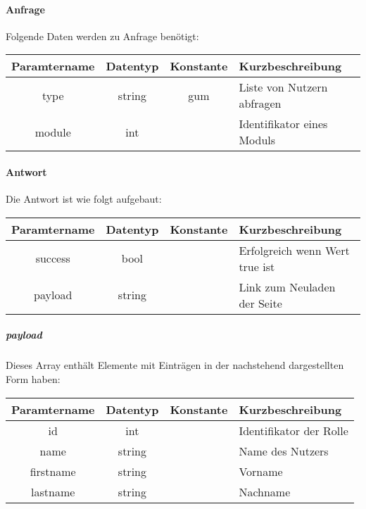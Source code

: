 \paragraph{Anfrage}Folgende Daten werden zu Anfrage benötigt:
\begin{table}[H]
	\begin{tabular}{|c|c|c|p{6.5cm}|}
		\hline
		\textbf{Paramtername} & \textbf{Datentyp} & \textbf{Konstante} & \textbf{Kurzbeschreibung}                                                                                               \\ \hline
		type                & string            & gum                & Liste von Nutzern abfragen \\ \hline
		module              & int               &                    & Identifikator eines Moduls \\ \hline
	\end{tabular}
\end{table}
\paragraph{Antwort}Die Antwort ist wie folgt aufgebaut:
\begin{table}[H]
	\begin{tabular}{|c|c|c|p{6.5cm}|}
		\hline
		\textbf{Paramtername} & \textbf{Datentyp} & \textbf{Konstante} & \textbf{Kurzbeschreibung}            \\ \hline                
		success             & bool             &                 & Erfolgreich wenn Wert {\glqq true\grqq} ist \\ \hline
		payload             & string           &                 & Link zum Neuladen der Seite \\ \hline
	\end{tabular}
\end{table}
\subparagraph{payload}Dieses Array enthält Elemente mit Einträgen in der nachstehend dargestellten Form haben:
\begin{table}[H]
	\begin{tabular}{|c|c|c|p{6.5cm}|}
		\hline
		\textbf{Paramtername} & \textbf{Datentyp} & \textbf{Konstante} & \textbf{Kurzbeschreibung}    \\ \hline
		id                      & int               &                 & Identifikator der Rolle \\ \hline
		name                    & string            &                 & Name des Nutzers \\ \hline
		firstname               & string            &                 & Vorname \\ \hline
		lastname                & string            &                 & Nachname \\ \hline
	\end{tabular}
\end{table}
